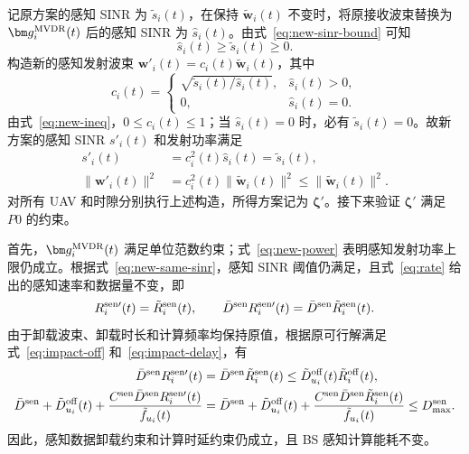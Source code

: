 记原方案的感知 SINR 为 $\tilde s_i(t)$，在保持 $\tilde{\bm w}_i(t)$ 不变时，将原接收波束替换为 $\bm g_i^{\rm MVDR}(t)$ 后的感知 SINR 为 $\hat s_i(t)$。由式~\eqref{eq:new-sinr-bound} 可知
\begin{equation}\label{eq:new-ineq}
\hat s_i(t)\ge\tilde s_i(t)\ge0.
\end{equation}
构造新的感知发射波束 $\bm w'_i(t)=c_i(t)\tilde{\bm w}_i(t)$，其中
\begin{equation}\label{eq:new-scale}
c_i(t)=
\begin{cases}
\sqrt{\tilde s_i(t)/\hat s_i(t)},&\hat s_i(t)>0,\\
0,&\hat s_i(t)=0.
\end{cases}
\end{equation}
由式~\eqref{eq:new-ineq}，$0\le c_i(t)\le1$；当 $\hat s_i(t)=0$ 时，必有 $\tilde s_i(t)=0$。故新方案的感知 SINR $s'_i(t)$ 和发射功率满足
\begin{align}\label{eq:new-same-sinr}
s'_i(t)&=c_i^2(t)\hat s_i(t)=\tilde s_i(t),\\
\|\bm w'_i(t)\|^2&=c_i^2(t)\|\tilde{\bm w}_i(t)\|^2\le\|\tilde{\bm w}_i(t)\|^2.\label{eq:new-power}
\end{align}
对所有 UAV 和时隙分别执行上述构造，所得方案记为 $\bm\zeta'$。接下来验证 $\bm\zeta'$ 满足 $P0$ 的约束。

首先，$\bm g_i^{\rm MVDR}(t)$ 满足单位范数约束；式~\eqref{eq:new-power} 表明感知发射功率上限仍成立。根据式~\eqref{eq:new-same-sinr}，感知 SINR 阈值仍满足，且式~\eqref{eq:rate} 给出的感知速率和数据量不变，即
\begin{equation}\label{eq:new-same-rate}
R_i^{\rm sen\prime}(t)=\tilde R_i^{\rm sen}(t),\qquad
\bar D^{\rm sen}R_i^{\rm sen\prime}(t)=\bar D^{\rm sen}\tilde R_i^{\rm sen}(t).
\end{equation}
由于卸载波束、卸载时长和计算频率均保持原值，根据原可行解满足式~\eqref{eq:impact-off} 和~\eqref{eq:impact-delay}，有
\begin{align}
\bar D^{\rm sen}R_i^{\rm sen\prime}(t)
&=\bar D^{\rm sen}\tilde R_i^{\rm sen}(t)
\le \tilde D_{u_i}^{\rm off}(t)\tilde R_i^{\rm off}(t),\label{eq:new-off}\\
\bar D^{\rm sen}+\tilde D_{u_i}^{\rm off}(t)
+\frac{C^{\rm sen}\bar D^{\rm sen}R_i^{\rm sen\prime}(t)}{\tilde f_{u_i}(t)}
&=\bar D^{\rm sen}+\tilde D_{u_i}^{\rm off}(t)
+\frac{C^{\rm sen}\bar D^{\rm sen}\tilde R_i^{\rm sen}(t)}{\tilde f_{u_i}(t)}
\le D_{\max}^{\rm sen}.\label{eq:new-delay}
\end{align}
因此，感知数据卸载约束和计算时延约束仍成立，且 BS 感知计算能耗不变。


